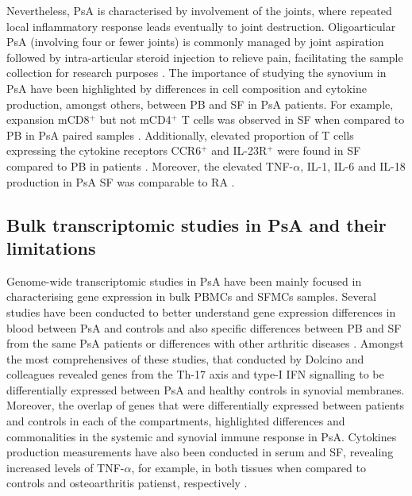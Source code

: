 Nevertheless, PsA is characterised by involvement of the joints, where repeated local inflammatory response leads eventually to joint destruction. Oligoarticular PsA (involving four or fewer joints) is commonly managed by joint aspiration followed by intra-articular steroid injection to relieve pain, facilitating the sample collection for research purposes \parencite{Kavanaugh2006}. The importance of studying the synovium in PsA have been highlighted by differences in cell composition and cytokine production, amongst others, between PB and SF in PsA patients. For example, expansion mCD8$^+$ but not mCD4$^+$ T cells was observed in SF when compared to PB in PsA paired samples \parencite{Ross2000}. Additionally, elevated proportion of T cells expressing the cytokine receptors CCR6$^+$ and IL-23R$^+$ were found in SF compared to PB in patients \parencite{Benham2013}. Moreover, the elevated TNF-$\alpha$, IL-1, IL-6 and IL-18 production in PsA SF was comparable to RA \parencite{Kujik2006}. 


\subsection{Bulk transcriptomic studies in PsA and their limitations}

Genome-wide transcriptomic studies in PsA have been mainly focused in characterising gene expression in bulk PBMCs and SFMCs samples. Several studies have been conducted to better understand gene expression differences in blood between PsA and controls and also specific differences between PB and SF from the same PsA patients or differences with other arthritic diseases \parencite{Stoeckman2006, Batiwalla2005, Gu2002, Dolcino2015}. Amongst the most comprehensives of these studies, that conducted by Dolcino and colleagues revealed genes from the Th-17 axis and type-I IFN signalling to be differentially expressed between PsA and healthy controls in synovial membranes. Moreover, the overlap of genes that were differentially expressed between patients and controls in each of the compartments, highlighted differences and commonalities in the systemic and synovial immune response in PsA. %
Cytokines production measurements have also been conducted in serum and SF, revealing increased levels of TNF-$\alpha$, for example, in both tissues when compared to controls and osteoarthritis patienst, respectively \parencite{Ritchlin1998,Li2017}. 

